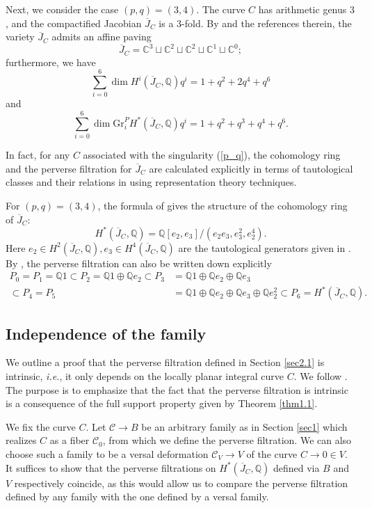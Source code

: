 \documentclass{pspum-l}
\theoremstyle{plain}
\theoremstyle{definition}
\theoremstyle{remark}
\newcommand{\BC}{{\mathbb{C}}}
\newcommand{\BQ}{{\mathbb{Q}}}
\newcommand{\CC}{{\mathcal C}}
\begin{document}
Next, we consider the case $(p,q) = (3,4)$. The curve $C$ has arithmetic genus $3$, and the compactified Jacobian $\overline{J}_C$ is a 3-fold. By \cite[Section 1.5]{MY} and the references therein, the variety $\overline{J}_C$ admits an affine paving
\[
\overline{J}_C = \BC^3 \sqcup \BC^2 \sqcup \BC^2 \sqcup \BC^1 \sqcup \BC^0; 
\]
furthermore,  we have
\[
\sum_{i=0}^6  \dim H^i(\overline{J}_C, \BQ) q^i= 1+q^2+2q^4 +q^6
\]
and
\[
\sum_{i=0}^6  \dim \mathrm{Gr}^P_i H^*(\overline{J}_C, \BQ) q^i= 1+q^2+q^3+ q^4 +q^6.
\]

In fact, for any $C$ associated with the singularity (\ref{p_q}), the cohomology ring and the perverse filtration for $\overline{J}_C$ are calculated explicitly in terms of tautological classes and their relations in \cite{OY, OY2} using representation theory techniques.

For $(p,q)=(3,4)$, the formula of \cite[Theorem 1.1.3]{OY2} gives the structure of the cohomology ring of $\overline{J}_C$:
\[
H^*(\overline{J}_C, \BQ) = \BQ[e_2, e_3]/(e_2e_3, e^2_3, e_2^4).
\]
Here $e_2 \in H^2(\overline{J}_C, \BQ), e_3 \in H^4(\overline{J}_C, \BQ)$ are the tautological generators given in \cite[Theorem 1.1.2]{OY2}. By \cite[Proof of Theorem 1.1.5]{OY2}, the perverse filtration can also be written down explicitly
\begin{align*}
    P_0=P_1 = \BQ 1 \subset P_2 = \BQ 1 \oplus \BQ e_2 \subset P_3 & = \BQ 1 \oplus \BQ e_2 \oplus \BQ e_3 \\ \subset P_4 = P_5 &  = \BQ1 \oplus \BQ e_2 \oplus \BQ e_3 \oplus \BQ e_2^2 \subset P_6 = H^*(\overline{J}_C, \BQ).
\end{align*}






\subsection{Independence of the family}

We outline a proof that the perverse filtration defined in Section \ref{sec2.1} is intrinsic, \emph{i.e.}, it only depends on the locally planar integral curve $C$. We follow \cite[Section 3.8]{MY}. The purpose is to emphasize that the fact that the perverse filtration is intrinsic is a consequence of the full support property given by Theorem \ref{thm1.1}.

We fix the curve $C$. Let $\CC \to B$ be an arbitrary family as in Section \ref{sec1} which realizes $C$ as a fiber $\CC_0$, from which we define the perverse filtration. We can also choose such a family to be a versal deformation $\CC_V \to V$ of the curve $C \to 0 \in V$. It suffices to show that the perverse filtrations on $H^*(\overline{J}_C, \BQ)$ defined via $B$ and $V$ respectively coincide, as this would allow us to compare the perverse filtration defined by any family with the one defined by a versal family.
\end{document}
